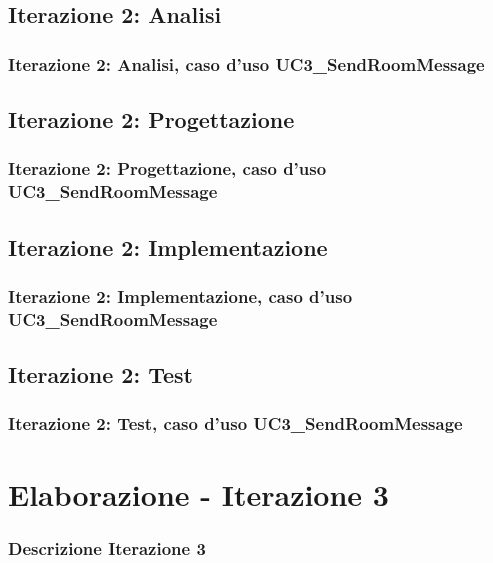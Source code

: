 \documentclass[t]{beamer} %
\begin{document}
\subsection{Iterazione 2: Analisi}
\begin{frame}
  \frametitle{Iterazione 2: Analisi, caso d'uso UC3\_SendRoomMessage}
\end{frame}

\subsection{Iterazione 2: Progettazione}
\begin{frame}
  \frametitle{Iterazione 2: Progettazione, caso d'uso UC3\_SendRoomMessage}
\end{frame}

\subsection{Iterazione 2: Implementazione}
\begin{frame}
  \frametitle{Iterazione 2: Implementazione, caso d'uso UC3\_SendRoomMessage}
\end{frame}

\subsection{Iterazione 2: Test}
\begin{frame}
  \frametitle{Iterazione 2: Test, caso d'uso UC3\_SendRoomMessage}
\end{frame}

\section{Elaborazione - Iterazione 3}
\begin{frame}
  \frametitle{Descrizione Iterazione 3}
\end{frame}
\end{document}
